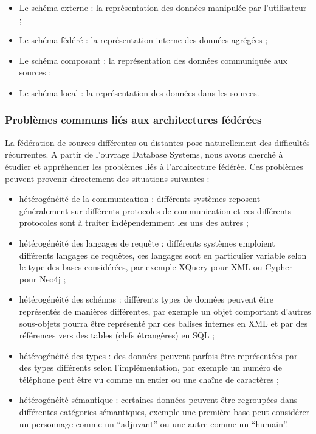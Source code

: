 \begin{itemize}
    \item Le schéma externe : la représentation des données manipulée par l’utilisateur ;

    \item Le schéma fédéré : la représentation interne des données agrégées ;

    \item Le schéma composant : la représentation des données communiquée aux sources ;

    \item Le schéma local : la représentation des données dans les sources.
\end{itemize}

\subsubsection{Problèmes communs liés aux architectures fédérées}

La fédération de sources différentes ou distantes pose naturellement des difficultés récurrentes. A partir de l’ouvrage Database Systems, nous avons cherché à étudier et appréhender les problèmes liés à l’architecture fédérée. Ces problèmes peuvent provenir directement des situations suivantes :

\begin{itemize}
    \item hétérogénéité de la communication : différents systèmes reposent généralement sur différents protocoles de communication et ces différents protocoles sont à traiter indépendemment les uns des autres ;
    \item hétérogénéité des langages de requête : différents systèmes emploient différents langages de requêtes, ces langages sont en particulier variable selon le type des bases considérées, par exemple XQuery pour XML ou Cypher pour Neo4j ;
    \item hétérogénéité des schémas : différents types de données peuvent être représentés de manières différentes, par exemple un objet comportant d’autres sous-objets pourra être représenté par des balises internes en XML et par des références vers des tables (clefs étrangères) en SQL ;
    \item  hétérogénéité des types : des données peuvent parfois être représentées par des types différents selon l’implémentation, par exemple un numéro de téléphone peut être vu comme un entier ou une chaîne de caractères ;
    \item hétérogénéité sémantique : certaines données peuvent être regroupées dans différentes catégories sémantiques, exemple une première base peut considérer un personnage comme un “adjuvant” ou une autre comme un “humain”.
\end{itemize}

